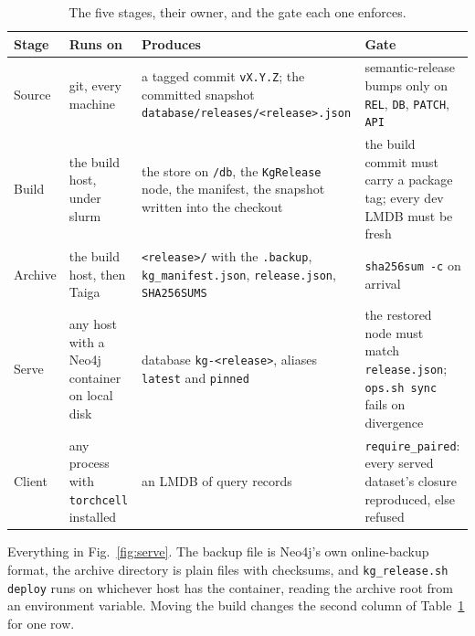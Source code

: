 \begin{table}[htbp]
\centering
\footnotesize
\caption{The five stages, their owner, and the gate each one enforces.}
\label{tab:stages}
\begin{tabular}{l>{\raggedright\arraybackslash}p{}>{\raggedright\arraybackslash}p{}>{\raggedright\arraybackslash}p{}}
\toprule
Stage & Runs on & Produces & Gate \\
\midrule
Source & git, every machine & a tagged commit \texttt{vX.Y.Z}; the committed snapshot \texttt{database/releases/<release>.json} & semantic-release bumps only on \texttt{REL}, \texttt{DB}, \texttt{PATCH}, \texttt{API} \\
Build & the build host, under slurm & the store on \texttt{/db}, the \texttt{KgRelease} node, the manifest, the snapshot written into the checkout & the build commit must carry a package tag; every dev LMDB must be fresh \\
Archive & the build host, then Taiga & \texttt{<release>/} with the \texttt{.backup}, \texttt{kg\_manifest.json}, \texttt{release.json}, \texttt{SHA256SUMS} & \texttt{sha256sum -c} on arrival \\
Serve & any host with a Neo4j container on local disk & database \texttt{kg-<release>}, aliases \texttt{latest} and \texttt{pinned} & the restored node must match \texttt{release.json}; \texttt{ops.sh sync} fails on divergence \\
Client & any process with \texttt{torchcell} installed & an LMDB of query records & \texttt{require\_paired}: every served dataset's closure reproduced, else refused \\
\bottomrule
\end{tabular}
\end{table}

Everything in Fig.~\ref{fig:serve}. The backup file
is Neo4j's own online-backup format, the archive directory is plain files with
checksums, and \texttt{kg\_release.sh deploy} runs on whichever host has the
container, reading the archive root from an environment variable. Moving the
build changes the second column of Table~\ref{tab:stages} for one row.

